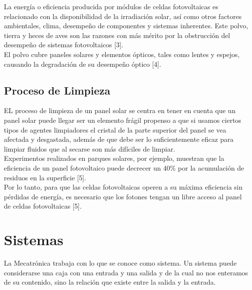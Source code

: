 La energía o eficiencia producida por módulos de celdas fotovoltaicas es relacionado con la disponibilidad de la irradiación solar, así como otros factores ambientales, clima, desempeño de componentes y sistemas inherentes. Este polvo, tierra y heces de aves son las razones con más mérito por la obstrucción del desempeño de sistemas fotovoltaicos [3].\\

El polvo cubre paneles solares y elementos ópticos, tales como lentes y espejos, causando la degradación de su desempeño óptico [4].
\subsection*{Proceso de Limpieza}
EL proceso de limpieza de un panel solar se centra en tener en cuenta que un panel solar puede llegar ser un elemento frágil propenso a que si usamos ciertos tipos de agentes limpiadores el cristal de la parte superior del panel se vea afectada y desgastada, además de que debe ser lo suficientemente eficaz para limpiar fluidos que al secarse son más difíciles de limpiar.\\

Experimentos realizados en parques solares, por ejemplo, muestran que la eficiencia de un panel fotovoltaico puede decrecer un 40\% por la acumulación de residuos en la superficie [5].\\

Por lo tanto, para que las celdas fotovoltaicas operen a su máxima eficiencia sin pérdidas de energía, es necesario que los fotones tengan un libre acceso al panel de celdas fotovoltaicas [5].

\section{Sistemas}
La Mecatrónica trabaja con lo que se conoce como sistema. Un sistema puede considerarse una caja con una entrada y una salida y de la cual no nos enteramos de su contenido, sino la relación que existe entre la salida y la entrada.\\

